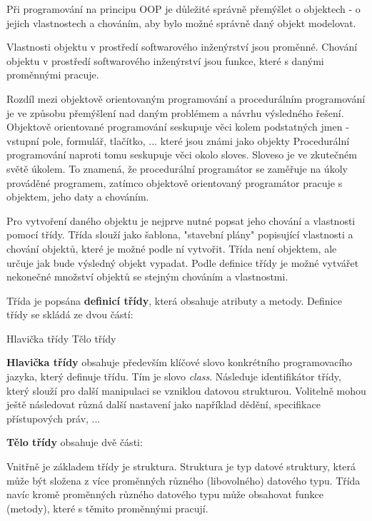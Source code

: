 Při programování na principu OOP je důležité správně přemýšlet o objektech - o jejich vlastnostech a chováním, aby bylo možné správně daný objekt modelovat.

Vlastnosti objektu v prostředí softwarového inženýrství jsou proměnné. Chování objektu v prostředí softwarového inženýrství jsou funkce, které s danými proměnnými pracuje. 

Rozdíl mezi objektově orientovaným programování a procedurálním programování je ve způsobu přemýšlení nad daným problémem a návrhu výsledného řešení. Objektově orientované programování seskupuje věci kolem podstatných jmen - vstupní pole, formulář, tlačítko, ... které jsou známi jako objekty Procedurální programování naproti tomu seskupuje věci okolo sloves. Sloveso je ve zkutečném světě úkolem. To znamená, že procedurální programátor se zaměřuje na úkoly prováděné programem, zatímco objektově orientovaný programátor pracuje s objektem, jeho daty a chováním.



Pro vytvoření daného objektu je nejprve nutné popsat jeho chování a vlastnosti pomocí třídy. Třída slouží jako šablona, "stavební plány" popisující vlastnosti a chování objektů, které je možné podle ní vytvořit. Třída není objektem, ale určuje jak bude výsledný objekt vypadat. Podle definice třídy je možné vytvářet nekonečné množství objektů se stejným chováním a vlastnostmi. 

Třída je popsána {\bf definicí třídy}, která obsahuje atributy a metody. Definice třídy se skládá ze dvou částí:

\vskip 4mm
\bod Hlavička třídy
\bod Tělo třídy
\vskip 4mm

{\bf Hlavička třídy} obsahuje především klíčové slovo konkrétního programovacího jazyka, který definuje třídu. Tím je slovo  {\it class}. Následuje identifikátor třídy, který slouží pro další manipulaci se vzniklou datovou strukturou. Volitelně mohou ještě následovat různá další nastavení jako například dědění, specifikace přístupových práv, ...

{\bf Tělo třídy} obsahuje dvě části:

\vskip 4mm
\vskip 4mm

Vnitřně je základem třídy je struktura. Struktura je typ datové struktury, která může být složena z více proměnných různého (libovolného) datového typu. Třída navíc kromě proměnných různého datového typu může obsahovat funkce (metody), které s těmito proměnnými pracují.



